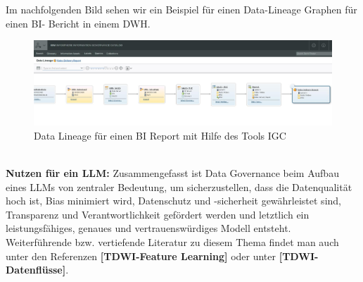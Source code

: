 \documentclass[12pt]{article}
\begin{document}
Im nachfolgenden Bild sehen wir ein Beispiel für einen Data-Lineage Graphen für einen BI- Bericht in einem DWH.
\\[0.2cm] 
%
\begin{figure}[htp]
  \centering
  \hspace*{-0.5cm} 
  \includegraphics[width=1.1\textwidth]{IGC-DataLineage}
  \caption{Data Lineage für einen BI Report mit Hilfe des Tools IGC}
  \label{fig:IGC-DataLineage}
\end{figure}\\[0.2cm]
\textbf{Nutzen für ein LLM:} Zusammengefasst ist Data Governance beim Aufbau eines LLMs von zentraler Bedeutung, um sicherzustellen, dass die Datenqualität hoch ist, Bias minimiert wird, Datenschutz und -sicherheit gewährleistet sind, Transparenz und Verantwortlichkeit gefördert werden und letztlich ein leistungsfähiges, genaues und vertrauenswürdiges Modell entsteht. \\[0.1cm]
Weiterführende bzw. vertiefende Literatur zu diesem Thema findet man auch unter den Referenzen \textbf{[TDWI-Feature Learning]} oder unter \textbf{[TDWI-Datenflüsse]}.  \\[0.2cm]
%
\end{document}
